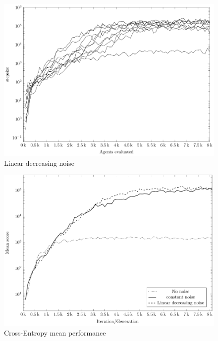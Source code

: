 \begin{figure}[H]
\begin{center}
\includegraphics[scale=0.48]{plots/linearNoisePlot}
\end{center}
\caption{Linear decreasing noise \label{fig:ceLinNoise}}
\end{figure}

\begin{figure}[H]
\begin{center}
\includegraphics[scale=0.8]{plots/meansPlot}
\end{center}
\caption{Cross-Entropy mean performance \label{fig:cemean}}
\end{figure}


